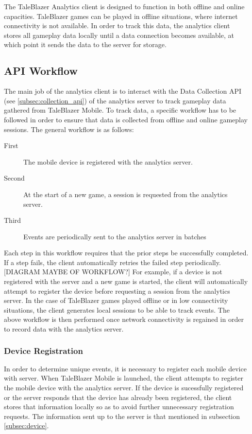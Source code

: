 The TaleBlazer Analytics client is designed to function in both offline and online capacities. TaleBlazer games can be played in offline situations, where internet connectivity is not available. In order to track this data, the analytics client stores all gameplay data locally until a data connection becomes available, at which point it sends the data to the server for storage.

\subsection{API Workflow}
\label{subsec:api_workflow}

The main job of the analytics client is to interact with the Data Collection API (see \ref{subsec:collection_api}) of the analytics server to track gameplay data gathered from TaleBlazer Mobile. To track data, a specific workflow has to be followed in order to ensure that data is collected from offline and online gameplay sessions. The general workflow is as follows:
	\begin{description}
		\item[First] The mobile device is registered with the analytics server.
		\item[Second] At the start of a new game, a session is requested from the analytics server.
		\item[Third] Events are periodically sent to the analytics server in batches
	\end{description}
Each step in this workflow requires that the prior steps be successfully completed. If a step fails, the client automatically retries the failed step periodically. [DIAGRAM MAYBE OF WORKFLOW?] For example, if a device is not registered with the server and a new game is started, the client will automatically attempt to register the device before requesting a session from the analytics server. In the case of TaleBlazer games played offline or in low connectivity situations, the client generates local sessions to be able to track events. The above workflow is then performed once network connectivity is regained in order to record data with the analytics server.

\subsubsection{Device Registration}

In order to determine unique events, it is necessary to register each mobile device with server. When TaleBlazer Mobile is launched, the client attempts to register the mobile device with the analytics server.
If the device is sucessfully registered or the server responds that the device has already been registered, the client stores that information locally so as to avoid further unnecessary registration requests. The information sent up to the server is that mentioned in subsection \ref{subsec:device}. 

